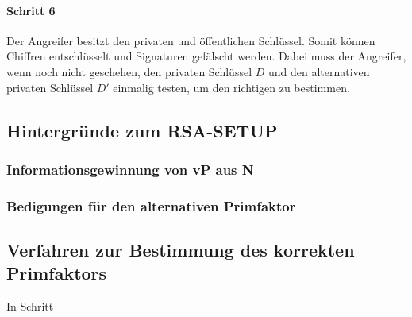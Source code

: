             \paragraph{Schritt 6} \label{sec-Schritt-Ang 6} Der Angreifer besitzt den privaten und öffentlichen Schlüssel. Somit können Chiffren entschlüsselt und Signaturen gefälscht werden. Dabei muss der Angreifer, wenn noch nicht geschehen, den privaten Schlüssel $D$ und den alternativen privaten Schlüssel $D'$ einmalig testen, um den richtigen zu bestimmen.

        \subsection{Hintergründe zum RSA-SETUP}
            \subsubsection{Informationsgewinnung von vP aus N}
                

            \subsubsection{Bedigungen für den alternativen Primfaktor} \label{sec-SETUP-Hin-Prim}
                

            \subsection{Verfahren zur Bestimmung des korrekten Primfaktors}
                In Schritt 




        



      


